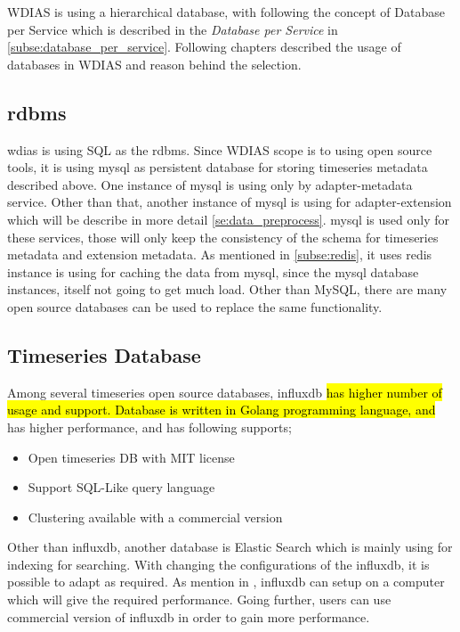 
WDIAS is using a hierarchical database, with following the concept of Database per Service which is described in the \emph{Database per Service} in \cref{subse:database_per_service}.
Following chapters described the usage of databases in WDIAS and reason behind the selection.

\subsection{\acrshort{rdbms}}
\label{subse:mysql}

\acrshort{wdias} is using SQL as the \acrfull{rdbms}. 
Since WDIAS scope is to using open source tools, it is using \acrshort{mysql} as persistent database for storing timeseries metadata described above.
One instance of \acrshort{mysql} is using only by adapter-metadata service.
Other than that, another instance of \acrshort{mysql} is using for adapter-extension which will be describe in more detail \cref{se:data_preprocess}.
\acrshort{mysql} is used only for these services, those will only keep the consistency of the schema for timeseries metadata and extension metadata.
As mentioned in \cref{subse:redis}, it uses \acrshort{redis} instance is using for caching the data from \acrshort{mysql}, since the \acrshort{mysql} database instances, itself not going to get much load.
Other than MySQL, there are many open source databases can be used to replace the same functionality.
\subsection{Timeseries Database}
\label{subse:influxdb}
Among several timeseries open source databases, \acrshort{influxdb} \cite{influxdbInfluxDBDocumentation} \hl{has higher number of usage and support. Database is written in Golang programming language, and} has higher performance, and has following supports;
\begin{itemize}
  \item Open timeseries DB with MIT license
  \item Support SQL-Like query language
  \item Clustering available with a commercial version
\end{itemize}
Other than \acrshort{influxdb}, another database is Elastic Search which is mainly using for indexing for searching.
With changing the configurations of the \acrshort{influxdb}, it is possible to adapt as required. As mention in \cite{influxdbInfluxDBDocumentation}, 
\acrshort{influxdb} can setup on a computer which will give the required performance. Going further, users can use commercial version of \acrshort{influxdb} in order to gain more performance.

